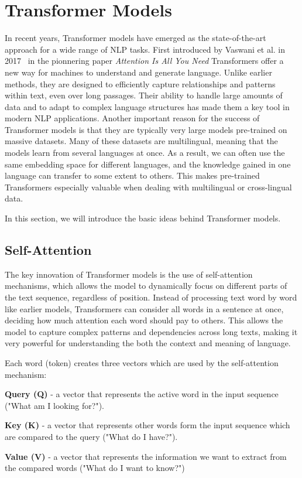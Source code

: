\documentclass[twoside]{ctuthesis}
\theoremstyle{plain}
\theoremstyle{definition}
\theoremstyle{note}
\begin{document}
\section{Transformer Models}

In recent years, Transformer models have emerged as the state-of-the-art approach for a wide range of NLP tasks. First introduced by Vaswani et al. in 2017~\cite{Vaswani2017} in the pionnering paper \textit{Attention Is All You Need} Transformers offer a new way for machines to understand and generate language. Unlike earlier methods, they are designed to efficiently capture relationships and patterns within text, even over long passages. Their ability to handle large amounts of data and to adapt to complex language structures has made them a key tool in modern NLP applications.
Another important reason for the success of Transformer models is that they are typically very large models pre-trained on massive datasets. Many of these datasets are multilingual, meaning that the models learn from several languages at once. As a result, we can often use the same embedding space for different languages, and the knowledge gained in one language can transfer to some extent to others. This makes pre-trained Transformers especially valuable when dealing with multilingual or cross-lingual data.\par
In this section, we will introduce the basic ideas behind Transformer models.\par

\subsection{Self-Attention}

The key innovation of Transformer models is the use of self-attention mechanisms, which allows the model to dynamically focus on different parts of the text sequence, regardless of position. Instead of processing text word by word like earlier models, Transformers can consider all words in a sentence at once, deciding how much attention each word should pay to others. This allows the model to capture complex patterns and dependencies across long texts, making it very powerful for understanding the both the context and meaning of language.\par

Each word (token) creates three vectors which are used by the self-attention mechanism:
\begin{list}{}{}
	\itemsep=0pt
	\item \textbf{Query (Q)} - a vector that represents the active word in the input sequence ("What am I looking for?").
	\item \textbf{Key (K)} - a vector that represents other words form the input sequence which are compared to the query ("What do I have?").
	\item \textbf{Value (V)} - a vector that represents the information we want to extract from the compared words ("What do I want to know?")
\end{list}
\end{document}
